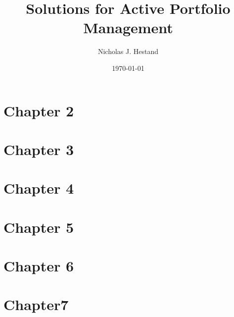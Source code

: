 \documentclass[10pt]{article}
\begin{document}
  \title{Solutions for Active Portfolio Management}
  \author{Nicholas J. Hestand}
  \date{\today}
  
  \maketitle
  
  \section{Chapter 2}
  
  
  \newpage
  \section{Chapter 3}
  
  
  \newpage
  \section{Chapter 4}
  
  
  \newpage
  \section{Chapter 5}
  
  
  \newpage
  \section{Chapter 6}
  
  
  \newpage
  \section{Chapter7}
  
  
  
\end{document}
